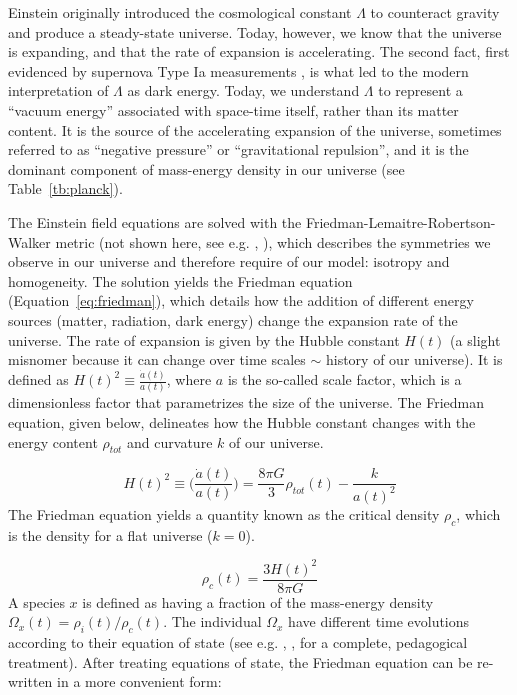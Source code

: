 Einstein originally introduced the cosmological constant $\Lambda$ to counteract gravity and produce a steady-state universe. Today, however, we know that the universe is expanding, and that the rate of expansion is accelerating. The second fact, first evidenced by supernova Type Ia measurements \cite{Riess1998} \cite{Perlmutter1998}, is what led to the modern interpretation of $\Lambda$ as dark energy. Today, we understand  $\Lambda$ to represent a ``vacuum energy'' associated with space-time itself, rather than its matter content. It is the source of the accelerating expansion of the universe, sometimes referred to as ``negative pressure'' or ``gravitational repulsion'', and it is the dominant component of mass-energy density in our universe (see Table~\ref{tb:planck}).

The Einstein field equations are solved with the Friedman-Lemaitre-Robertson-Walker metric (not shown here, see e.g. \cite{Ryden2006}, \cite{Kolb1990}), which describes the symmetries we observe in our universe and therefore require of our model: isotropy and homogeneity. The solution yields the Friedman equation (Equation~\ref{eq:friedman}), which details how the addition of different energy sources (matter, radiation, dark energy) change the expansion rate of the universe. The rate of expansion is given by the Hubble constant $H(t)$ (a slight misnomer because it can change over time scales $\sim$ history of our universe). It is defined as $H(t)^{2} \equiv \frac{\dot{a}(t)}{a(t)}$, where $a$ is the so-called scale factor, which is a dimensionless factor that parametrizes the size of the universe. The Friedman equation, given below, delineates how the Hubble constant changes with the energy content $\rho_{tot}$ and curvature $k$ of our universe.

\begin{equation}
\label{eq:friedman}
H(t)^{2} \equiv \Big( \frac{\dot{a}(t)}{a(t)} \Big) = \frac{8 \pi G}{3} \rho_{tot}(t) - \frac{k}{a(t)^{2}}
\end{equation}
The Friedman equation yields a quantity known as the critical density $\rho_{c}$, which is the density for a flat universe ($k=0$). 

\begin{equation}
\rho_{c}(t) = \frac{ 3 H(t)^{2}}{8 \pi G} 
\end{equation}
A species $x$ is defined as having a fraction of the mass-energy density $\Omega_{x}(t) = \rho_{i}(t) / \rho_{c}(t)$. The individual $\Omega_{x}$ have different time evolutions according to their equation of state (see e.g. \cite{Ryden2006}, \cite{Kolb1990}, for a complete, pedagogical treatment). After treating equations of state, the Friedman equation can be re-written in a more convenient form: 

